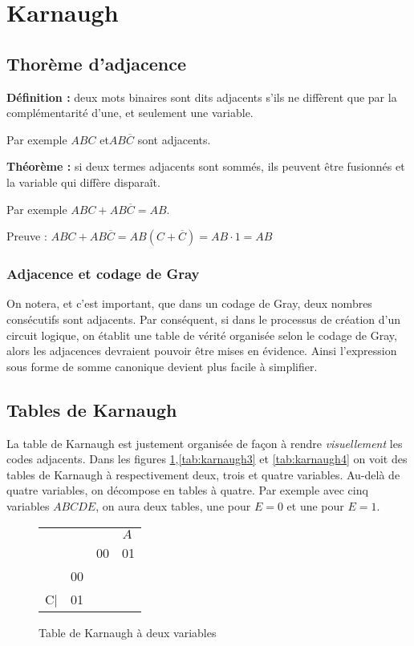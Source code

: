 \documentclass[a4paper,11pt]{book}
\theoremstyle{definition}
\theoremstyle{definition}
\begin{document}
\newpage

\section{Karnaugh}

\subsection{Thorème d'adjacence}
\textbf{Définition :} deux mots binaires sont dits adjacents s'ils ne diffèrent que par la complémentarité d'une, et seulement une variable. 

Par exemple $ABC$ et$AB\overline{C}$ sont adjacents.

\textbf{Théorème :} si deux termes adjacents sont sommés, ils peuvent être fusionnés et la variable qui diffère disparaît.

Par exemple $ABC + AB\overline{C} = AB$.

Preuve : $ABC + AB\overline{C} = AB(C + \overline{C}) = AB\cdot 1 = AB$

\subsubsection{Adjacence et codage de Gray}
On notera, et c'est important, que dans un codage de Gray, deux nombres consécutifs sont adjacents. Par conséquent, si dans le processus de création d'un circuit logique, on établit une table de vérité organisée selon le codage de Gray, alors les adjacences devraient pouvoir être mises en évidence.
Ainsi l'expression sous forme de somme canonique devient plus facile à simplifier.

\subsection{Tables de Karnaugh}
La table de Karnaugh est justement organisée de façon à rendre \textit{visuellement} les codes adjacents. Dans les figures \ref{tab:karnaugh2},\ref{tab:karnaugh3} et \ref{tab:karnaugh4} on voit des tables de Karnaugh à respectivement deux, trois et quatre variables. Au-delà de quatre variables, on décompose en tables à quatre. Par exemple avec cinq variables $ABCDE$, on aura deux tables, une pour $E=0$ et une pour $E=1$.

\begin{figure}
  \centering
  \begin{tabular}{|cc|c|c|}
    \hline
         & &  \multicolumn{2}{r|}{\underline{$\:A\:$}} \\
         & & 00 & 01 \\
    \hline
         & 00 & & \\
    \cline{2-4}
         C| & 01 & &\\
    \hline
  \end{tabular}
  \caption{Table de Karnaugh à deux variables}
  \label{tab:karnaugh2}
\end{figure}
\end{document}
